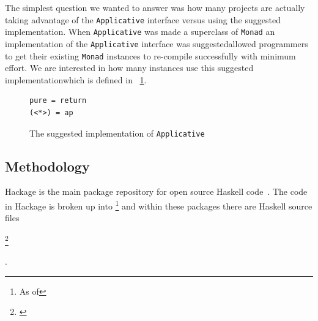\DIFaddend The simplest question we wanted to answer was how many projects are actually taking advantage of the \texttt{Applicative} interface versus using the suggested implementation. When \texttt{Applicative} was made a superclass of \texttt{Monad} an implementation of the \texttt{Applicative} interface was suggested\DIFdelbegin {}\DIFdelend \DIFaddbegin {}\DIFaddend allowed programmers to get their existing \texttt{Monad} instances to re-compile successfully with minimum effort. We are interested in how many instances use this suggested implementation\DIFaddbegin \DIFadd{, }\DIFaddend which is defined in \DIFdelbegin {}\DIFdelend \DIFaddbegin {}\DIFaddend ~\ref{appSugImp}.

\begin{figure}[t]
\begin{lstlisting}
pure = return
(<*>) = ap
\end{lstlisting}
\caption{The suggested implementation of \texttt{Applicative}}
\label{appSugImp}
\end{figure}

\subsection{Methodology}

Hackage is the main package repository for open source Haskell code~\DIFdelbegin {}\DIFdelend \DIFaddbegin {}\DIFaddend . The code in Hackage is broken up into \DIFdelbegin {}\DIFdelend \DIFaddbegin {}\DIFaddend \footnote{As of \DIFdelbegin {}\DIFdelend \DIFaddbegin {}\DIFaddend } and within these packages there are \DIFdelbegin {}\DIFdelend \DIFaddbegin {}\DIFaddend Haskell source files\DIFdelbegin {}%

\texttt{}%
\textit{} %
\footnote{\textit{} %
\texttt{}%
} %
\addtocounter{footnote}{-1}%
\textit{} %
\texttt{} %
\texttt{} %
\DIFdelend \DIFaddbegin {}\DIFaddend . 

